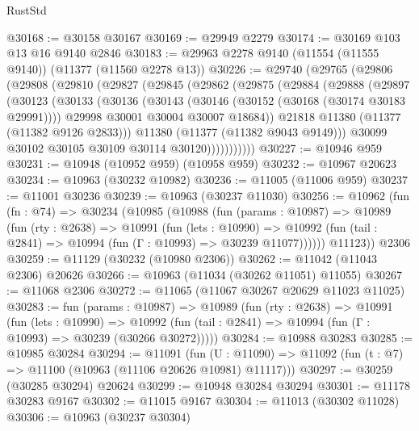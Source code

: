 \begin{lexlean}{RustStd}
\begin{coremodule}
@30168 := @30158 @30167
@30169 := @29949 @2279
@30174 := @30169 @103 @13 @16 @9140 @2846
@30183 := @29963 @2278 @9140 (@11554 (@11555 @9140)) (@11377 (@11560 @2278 @13))
@30226 := @29740
    (@29765
      (@29806
        (@29808
          (@29810
            (@29827
              (@29845
                (@29862
                  (@29875
                    (@29884
                      (@29888
                        (@29897
                          (@30123
                            (@30133
                              (@30136
                                (@30143
                                  (@30146 (@30152 (@30168 (@30174 @30183 @29991))))
                                  @29998
                                  @30001
                                  @30004
                                  @30007
                                  @18684))
                              @21818
                              @11380
                              (@11377 (@11382 @9126 @2833)))
                            @11380
                            (@11377 (@11382 @9043 @9149)))
                          @30099
                          @30102
                          @30105
                          @30109
                          @30114
                          @30120)))))))))))
@30227 := @10946 @959
@30231 := @10948 (@10952 @959) (@10958 @959)
@30232 := @10967 @20623
@30234 := @10963 (@30232 @10982)
@30236 := @11005 (@11006 @959)
@30237 := @11001 @30236
@30239 := @10963 (@30237 @11030)
@30256 := @10962
    (fun (fn : @74) =>
    @30234
      (@10985
        (@10988
          (fun (params : @10987) =>
          @10989
            (fun (rty : @2638) =>
            @10991
              (fun (lets : @10990) =>
              @10992 (fun (tail : @2841) => @10994 (fun (Γ : @10993) => @30239 @11077))))))
        @11123))
    @2306
@30259 := @11129 (@30232 (@10980 @2306))
@30262 := @11042 (@11043 @2306) @20626
@30266 := @10963 (@11034 (@30262 @11051) @11055)
@30267 := @11068 @2306
@30272 := @11065 (@11067 @30267 @20629 @11023 @11025)
@30283 := fun (params : @10987) =>
  @10989
    (fun (rty : @2638) =>
    @10991
      (fun (lets : @10990) =>
      @10992 (fun (tail : @2841) => @10994 (fun (Γ : @10993) => @30239 (@30266 @30272)))))
@30284 := @10988 @30283
@30285 := @10985 @30284
@30294 := @11091
    (fun (U : @11090) => @11092 (fun (t : @7) => @11100 (@10963 (@11106 @20626 @10981) @11117)))
@30297 := @30259 (@30285 @30294) @20624
@30299 := @10948 @30284 @30294
@30301 := @11178 @30283 @9167
@30302 := @11015 @9167
@30304 := @11013 (@30302 @11028)
@30306 := @10963 (@30237 @30304)

\end{coremodule}
\end{lexlean}
